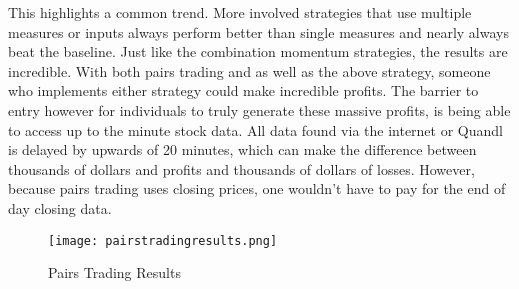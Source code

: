 \documentclass[../thesis.tex]{subfiles}
\begin{document}
This highlights a common trend. More involved strategies that use multiple measures or inputs always perform better than single measures and nearly always beat the baseline. Just like the combination momentum strategies, the results are incredible. With both pairs trading and as well as the above strategy, someone who implements either strategy could make incredible profits. The barrier to entry however for individuals to truly generate these massive profits, is being able to access up to the minute stock data. All data found via the internet or Quandl is delayed by upwards of 20 minutes, which can make the difference between thousands of dollars and profits and thousands of dollars of losses. However, because pairs trading uses closing prices, one wouldn't have to pay for the end of day closing data.

\begin{figure}[h]
\centering
\texttt{[image: pairstradingresults.png]}
\caption{Pairs Trading Results \label{overflow}}
\label{PAIRSRESULTSfigure}
\end{figure}
\end{document}

